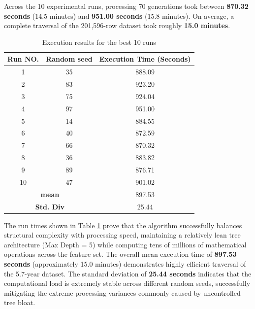 \documentclass[12pt]{article}
\begin{document}
    Across the 10 experimental runs, processing 70 generations took between \textbf{870.32 seconds} (14.5 minutes) and \textbf{951.00 seconds} (15.8 minutes). On average, a complete traversal of the 201,596-row dataset took roughly \textbf{15.0 minutes}.

    \begin{table}[h]
        \centering
        \begin{tabular}{|c|c|c|}
            \hline
            \textbf{Run NO.} & \textbf{Random seed} & \textbf{Execution Time (Seconds)}  \\
            \hline
             1 & 35 & 888.09 \\
            \hline
             2 & 83 & 923.20 \\
            \hline
             3 & 75 & 924.04 \\
            \hline
             4 & 97 & 951.00 \\
            \hline
             5 & 14 & 884.55 \\
            \hline
             6 & 40 & 872.59 \\
            \hline
             7 & 66 & 870.32 \\
            \hline
             8 & 36 & 883.82 \\
            \hline
             9 & 89 & 876.71 \\
            \hline
             10 & 47 & 901.02 \\
              \hline
              \hline
              \multicolumn{2}{|c|}{\textbf{mean}} & 897.53 \\
              \hline
              \multicolumn{2}{|c|}{\textbf{Std. Div}} & 25.44 \\
              \hline
        \end{tabular}
        \caption{Execution results for the best 10 runs}
        \label{tab:runtimes}
    \end{table}

    The run times shown in Table \ref{tab:runtimes} prove that the algorithm successfully balances structural complexity with processing speed, maintaining a relatively lean tree architecture (Max Depth = 5) while computing tens of millions of mathematical operations across the feature set. The overall mean execution time of \textbf{897.53 seconds} (approximately 15.0 minutes) demonstrates highly efficient traversal of the 5.7-year dataset. The standard deviation of \textbf{25.44 seconds} indicates that the computational load is extremely stable across different random seeds, successfully mitigating the extreme processing variances commonly caused by uncontrolled tree bloat.
\end{document}
